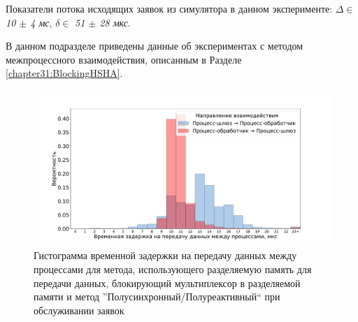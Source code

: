 Показатели потока исходящих заявок из симулятора в данном эксперименте: $\Delta \in$ \textit{10 $\pm$ 4 мс}, $\delta \in$ \textit{51 $\pm$ 28 мкс}.

В данном подразделе приведены данные об экспериментах с методом межпроцессного взаимодействия, описанным в Разделе \ref{chapter31:BlockingHSHA}.

\begin{figure}[!h]
\caption{Гистограмма временной задержки на передачу данных между процессами для метода, использующего разделяемую память для передачи данных, блокирующий мультиплексор в разделяемой памяти и метод ''Полусинхронный/Полуреактивный`` при обслуживании заявок}
\label{chapter41:FigBlockingHSHA}
\includegraphics[width=\textwidth]{../../graphics/hist/BlockingHSHA}
\end{figure}

